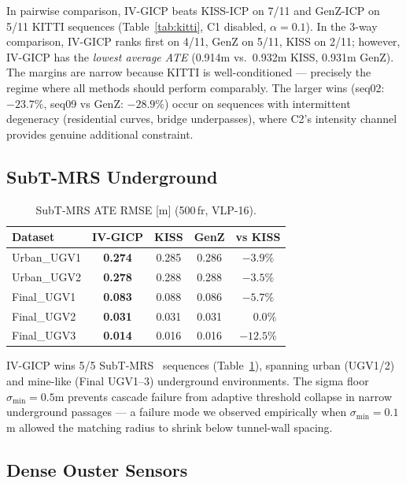 \documentclass[journal,letterpaper,10pt]{IEEEtran}
\newcommand{\best}[1]{\textbf{#1}}
\begin{document}
In pairwise comparison, IV-GICP beats KISS-ICP on 7/11 and GenZ-ICP
on 5/11 KITTI sequences (Table~\ref{tab:kitti}, C1 disabled, $\alpha{=}0.1$).
In the 3-way comparison, IV-GICP ranks first on 4/11, GenZ on 5/11,
KISS on 2/11; however, IV-GICP has the \emph{lowest average ATE}
(0.914m vs.\ 0.932m KISS, 0.931m GenZ).
The margins are narrow because KITTI is well-conditioned
--- precisely the regime where all methods should perform comparably.
The larger wins (seq02: $-23.7\%$, seq09 vs GenZ: $-28.9\%$) occur on
sequences with intermittent degeneracy (residential curves, bridge
underpasses), where C2's intensity channel provides genuine additional
constraint.

\subsection{SubT-MRS Underground}\label{sec:subt}

\begin{table}[t]
\centering
\caption{SubT-MRS ATE RMSE [m] (500\,fr, VLP-16).}
\label{tab:subt}
\begin{tabular}{lcccc}
\toprule
Dataset & IV-GICP & KISS & GenZ & vs KISS \\
\midrule
Urban\_UGV1 & \best{0.274} & 0.285 & 0.286 & $-3.9\%$ \\
Urban\_UGV2 & \best{0.278} & 0.288 & 0.288 & $-3.5\%$ \\
Final\_UGV1 & \best{0.083} & 0.088 & 0.086 & $-5.7\%$ \\
Final\_UGV2 & \best{0.031} & 0.031 & 0.031 & $\phantom{+}0.0\%$ \\
Final\_UGV3 & \best{0.014} & 0.016 & 0.016 & $-12.5\%$ \\
\bottomrule
\end{tabular}
\end{table}

IV-GICP wins 5/5 SubT-MRS~\cite{subt2021} sequences
(Table~\ref{tab:subt}), spanning urban (UGV1/2) and mine-like
(Final UGV1--3) underground environments.
The sigma floor $\sigma_{\min}{=}0.5$m prevents cascade failure from
adaptive threshold collapse in narrow underground passages --- a
failure mode we observed empirically when $\sigma_{\min}{=}0.1$m
allowed the matching radius to shrink below tunnel-wall spacing.

\subsection{Dense Ouster Sensors}\label{sec:ouster}
\end{document}
